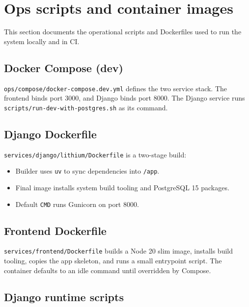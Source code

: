 \section{Ops scripts and container images}
\label{sec:ops:scripts}

This section documents the operational scripts and Dockerfiles used to run the system locally and in CI.

\subsection{Docker Compose (dev)}
\label{subsec:ops:scripts:compose}

\texttt{ops/compose/docker-compose.dev.yml} defines the two service stack. The frontend binds port 3000, and Django binds port 8000. The Django service runs \texttt{scripts/run-dev-with-postgres.sh} as its command.

\subsection{Django Dockerfile}
\label{subsec:ops:scripts:djangoimage}

\texttt{services/django/lithium/Dockerfile} is a two-stage build:

\begin{itemize}
  \item Builder uses \texttt{uv} to sync dependencies into \texttt{/app}.
  \item Final image installs system build tooling and PostgreSQL 15 packages.
  \item Default \texttt{CMD} runs Gunicorn on port 8000.
\end{itemize}

\subsection{Frontend Dockerfile}
\label{subsec:ops:scripts:frontendimage}

\texttt{services/frontend/Dockerfile} builds a Node 20 slim image, installs build tooling, copies the app skeleton, and runs a small entrypoint script. The container defaults to an idle command until overridden by Compose.

\subsection{Django runtime scripts}
\label{subsec:ops:scripts:django}

